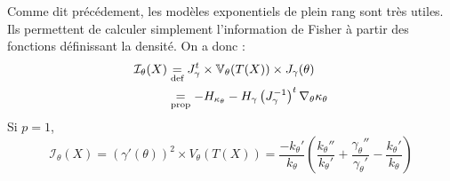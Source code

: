 \begin{proposition}
    Comme dit précédement, les modèles exponentiels de plein rang sont très utiles. 
    Ils permettent de calculer simplement l'information de Fisher à partir des fonctions 
    définissant la densité. On a donc : 
        \begin{align*}
            \mathcal{I}_\theta(X) &\underset{\text{def}}{=} J_{\gamma}^t \times \mathbb{V}_\theta(T(X)) \times J_\gamma(\theta) \\ 
            &\underset{\text{prop}}{=} - H_{ \kappa_\theta} - H_{\gamma} \left( J_{\gamma}^{-1}\right)^t \nabla_\theta \kappa_\theta
        \end{align*}
    Si $p = 1$, 
        $$ \mathcal{I}_\theta(X) = ( \gamma'(\theta))^2 \times V_\theta(T(X))
            = \frac{- k_\theta'}{k_\theta} \left( \frac{k_\theta ''}{k_\theta'} + \frac{ \gamma_\theta ''}{\gamma_\theta'} 
            - \frac{k_\theta'}{k_\theta}\right)
        $$
\end{proposition}

